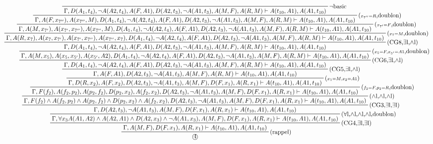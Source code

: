 \documentclass[10pt]{extarticle}
\begin{document}
\begin{landscape}
\begin{displaymath}
\prftree[r]{(rappel)}
{\prftree[r]{(CG4,$\exists$l,$\exists$l)}
{\prftree[r]{($\forall$l,$\land$l,$\land$l,$\land$l,doublon)}
{\prftree[r]{(CG3,$\exists$l,$\exists$l)}
{\prftree[r]{($\land$l,$\land$l,$\land$l)}
{\prftree[r]{($\scriptstyle f_2=F,p_2=R$,doublon)}
{\prftree[r]{($\scriptstyle x_1=M,x_2=A1$)}
{\prftree[r]{(CG5,$\exists$l,$\land$l)}
{\prftree[r]{(CG6,$\exists$l,$\land$l)}
{\prftree[r]{($\scriptstyle x_5=F,x_{5'}=A1$,doublon)}
{\prftree[r]{(CG8,$\exists$l,$\land$l)}
{\prftree[r]{($\scriptstyle x_7=M$,doublon)}
{\prftree[r]{($\scriptstyle x_{7'}=F$,doublon)}
{\prftree[r]{($\scriptstyle x_{7''}=R$,doublon)}
{\prftree[r]{$\neg$basic}
{}
{\Gamma , D(A_1,t_4) , \neg A(A2,t_4) , A(F,A1) , D(A2,t_3) , \neg A(A1,t_3) , A(M,F) , A(R,M) \vdash A(t_{10},A1) , A(A1,t_{10})}}
{\Gamma , A(F,x_{7''}) , A(x_{7''},M) , D(A_1,t_4) , \neg A(A2,t_4) , A(F,A1) , D(A2,t_3) , \neg A(A1,t_3) , A(M,F) , A(R,M) \vdash A(t_{10},A1) , A(A1,t_{10})}}
{\Gamma , A(M,x_{7'}) , A(x_{7'},x_{7''}) , A(x_{7''},M) , D(A_1,t_4) , \neg A(A2,t_4) , A(F,A1) , D(A2,t_3) , \neg A(A1,t_3) , A(M,F) , A(R,M) \vdash A(t_{10},A1) , A(A1,t_{10})}}
{\Gamma , A(R,x_7) , A(x_7,x_{7'}) , A(x_{7'},x_{7''}) , A(x_{7''},x_7) , D(A_1,t_4) , \neg A(A2,t_4) , A(F,A1) , D(A2,t_3) , \neg A(A1,t_3) , A(M,F) , A(R,M) \vdash A(t_{10},A1) , A(A1,t_{10})}}
{\Gamma , D(A_1,t_4) , \neg A(A2,t_4) , A(F,A1) , D(A2,t_3) , \neg A(A1,t_3) , A(M,F) , A(R,M) \vdash A(t_{10},A1) , A(A1,t_{10})}}
{\Gamma , A(M,x_5) , A(x_5,x_{5'}) , A(x_{5'}, A2) , D(A_1,t_4) , \neg A(A2,t_4) , A(F,A1) , D(A2,t_3) , \neg A(A1,t_3) , A(M,F) , A(R,M) \vdash A(t_{10},A1) , A(A1,t_{10})}}
{\Gamma , D(A_1,t_4) , \neg A(A2,t_4) , A(F,A1) , D(A2,t_3) , \neg A(A1,t_3) , A(M,F) , A(R,M) \vdash A(t_{10},A1) , A(A1,t_{10})}}
{\Gamma , A(F,A1) , D(A2,t_3) , \neg A(A1,t_3) , A(M,F) , A(R,M) \vdash A(t_{10},A1) , A(A1,t_{10})}}
{\Gamma , D(R,x_2) , A(F,x_2) , D(A2,t_3) , \neg A(A1,t_3) , A(M,F) , D(F,x_1) , A(R,x_1) \vdash A(t_{10},A1) , A(A1,t_{10})}}
{\Gamma , F(f_2) , A(f_2,p_2) , A(p_2,f_2) , D(p_2,x_2) , A(f_2,x_2) , D(A2,t_3) , \neg A(A1,t_3) , A(M,F) , D(F,x_1) , A(R,x_1) \vdash A(t_{10},A1) , A(A1,t_{10})}}
{\Gamma , F(f_2) \land A(f_2,p_2) \land A(p_2,f_2) \land D(p_2,x_2) \land A(f_2,x_2) , D(A2,t_3) , \neg A(A1,t_3) , A(M,F) , D(F,x_1) , A(R,x_1) \vdash A(t_{10},A1) , A(A1,t_{10})}}
{\Gamma , D(A2,t_3) , \neg A(A1,t_3) , A(M,F) , D(F,x_1) , A(R,x_1) \vdash A(t_{10},A1) , A(A1,t_{10})}}
{\Gamma , \forall x_3 A(A1,A2) \land A(A2,A1) \land D(A2,x_3) \land \neg A(A1,x_3) , A(M,F) , D(F,x_1) , A(R,x_1) \vdash A(t_{10},A1) , A(A1,t_{10})}}
{\Gamma , A(M,F) , D(F,x_1) , A(R,x_1) \vdash A(t_{10},A1) , A(A1,t_{10})}}
{\text{\textcircled{4}}}
\end{displaymath}

\end{landscape}
\newpage
\end{document}
